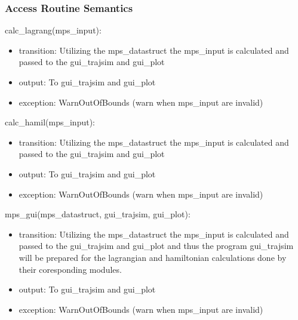 \documentclass[12pt, titlepage]{article}
\begin{document}
\subsubsection{Access Routine Semantics}

\noindent calc\_lagrang(mps\_input):
\begin{itemize}
\item transition: Utilizing the mps\_datastruct the mps\_input is calculated and passed to the gui\_trajsim and gui\_plot  
\item output: To gui\_trajsim and gui\_plot  
\item exception: WarnOutOfBounds (warn when mps\_input are invalid)  
\end{itemize}

\noindent calc\_hamil(mps\_input):
\begin{itemize}
\item transition: Utilizing the mps\_datastruct the mps\_input is calculated and passed to the gui\_trajsim and gui\_plot  
\item output: To gui\_trajsim and gui\_plot  
\item exception: WarnOutOfBounds (warn when mps\_input are invalid)  
\end{itemize}

\noindent mps\_gui(mps\_datastruct, gui\_trajsim, gui\_plot):
\begin{itemize}
\item transition: Utilizing the mps\_datastruct the mps\_input is calculated and passed to the gui\_trajsim and gui\_plot 
and thus the program gui\_trajsim will be prepared for the lagrangian and hamiltonian calculations done by their 
coresponding modules.
\item output: To gui\_trajsim and gui\_plot  
\item exception: WarnOutOfBounds (warn when mps\_input are invalid)  
\end{itemize}



\end{document}
